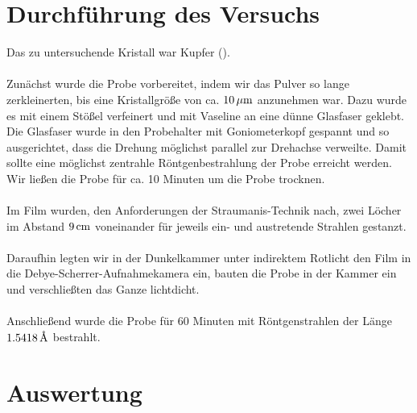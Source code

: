 \documentclass[a4paper,titlepage]{scrartcl}
\newcommand{\angstrom}{\mbox{\normalfont\AA}}
\numberwithin{equation}{section}
\begin{document}
\section{Durchführung des Versuchs}
Das zu untersuchende Kristall war Kupfer ().\\ \\
Zunächst wurde die Probe vorbereitet, indem wir das Pulver so lange zerkleinerten, bis eine Kristallgröße von ca. $\unit[10]{\mu m}$ anzunehmen war. Dazu wurde es mit einem Stößel verfeinert und mit Vaseline an eine dünne Glasfaser geklebt. Die Glasfaser wurde in den Probehalter mit Goniometerkopf gespannt und so ausgerichtet, dass die Drehung möglichst parallel zur Drehachse verweilte. Damit sollte eine möglichst zentrahle Röntgenbestrahlung der Probe erreicht werden. Wir ließen die Probe für ca. 10 Minuten um die Probe trocknen.\\ \\
Im Film wurden, den Anforderungen der Straumanis-Technik nach, zwei Löcher im Abstand $\unit[9]{cm}$ voneinander für jeweils ein- und austretende Strahlen gestanzt.\\ \\
Daraufhin legten wir in der Dunkelkammer unter indirektem Rotlicht den Film in die Debye-Scherrer-Aufnahmekamera ein, bauten die Probe in der Kammer ein und verschließten das Ganze lichtdicht.\\ \\
Anschließend wurde die Probe für 60 Minuten mit Röntgenstrahlen der Länge $\unit[1.5418]{\angstrom}$ bestrahlt.
\section{Auswertung}
\end{document}
